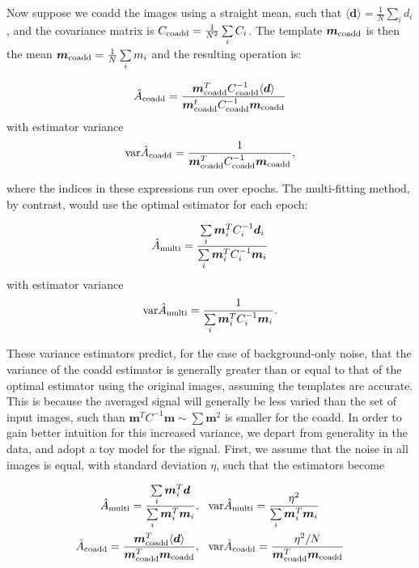 \documentclass[fleqn,useAMS,usenatbib]{mnras}
\newcommand{\coadd}{{\rm coadd}}
\begin{document}
Now suppose we coadd the images using a straight mean, such that $\langle
\boldsymbol{d} \rangle = \frac{1}{N}\sum\limits_i d_i$, and the covariance
matrix is $C_\coadd = \frac{1}{N^2}\sum\limits_i C_i$.  The template
$\boldsymbol{m}_\coadd$ is then the mean $\boldsymbol{m}_\coadd = 
\frac{1}{N}\sum\limits_i m_i$
and the resulting operation is:

\begin{align}
\hat{A}_\coadd = \frac{\boldsymbol{m}_\coadd^T C_\coadd^{-1} \langle 
\boldsymbol{d} \rangle}{\boldsymbol{m}_\coadd^t 
C_\coadd^{-1}\boldsymbol{m}_\coadd} 
\end{align}
with estimator variance
\begin{align} \label{eq:exact_var_coadd}
{\rm var}\hat{A}_\coadd = \frac{1}{\boldsymbol{m}_\coadd^T 
C_\coadd^{-1}\boldsymbol{m}_\coadd},
\end{align}

where the indices in these expressions run over epochs. The multi-fitting
method, by contrast, would use the optimal estimator for each epoch:

\begin{align}
\hat{A}_{\rm multi} = \frac{\sum\limits_i \boldsymbol{m}_i^T 
C_i^{-1}\boldsymbol{d}_i}{\sum\limits_i \boldsymbol{m}_i^T 
C_i^{-1}\boldsymbol{m}_i}
\end{align}
with estimator variance
\begin{align}
\label{eq:exact_var_multi}
{\rm var}\hat{A}_{\rm multi} = \frac{1}{\sum\limits_i \boldsymbol{m}_i^T 
C_i^{-1}\boldsymbol{m}_i}.
\end{align}

These variance estimators predict, for the case of background-only noise, that 
the variance of the coadd estimator is generally greater than or equal to that of
the optimal estimator using the original images, assuming the templates are
accurate.  This is because the averaged signal will generally be less varied
than the set of input images, such than $\boldsymbol{m}^T C^{-1} \boldsymbol{m}
\sim \sum \boldsymbol{m}^2$ is smaller for the coadd.
In order to gain better intuition for this increased variance, we depart from
generality in the data, and adopt a toy model for the signal.  First, we assume
that the noise in all images is equal, with standard deviation $\eta$, such
that the estimators become

\begin{align}
\hat{A}_{\rm multi} = \frac{\sum\limits_i \boldsymbol{m}_i^T 
\boldsymbol{d}}{\sum\limits_i \boldsymbol{m}_i^T \boldsymbol{m}_i}&, ~~
{\rm var}\hat{A}_{\rm multi} = \frac{\eta^2}{\sum\limits_i 
\boldsymbol{m}_i^T \boldsymbol{m}_i}\\
\hat{A}_\coadd = \frac{\boldsymbol{m}_\coadd^T \langle \boldsymbol{d} 
\rangle}{\boldsymbol{m}_\coadd^T \boldsymbol{m}_\coadd}&, ~~
{\rm var}\hat{A}_\coadd = \frac{\eta^2/N}{\boldsymbol{m}_\coadd^T 
\boldsymbol{m}_\coadd}
\end{align}
\end{document}
